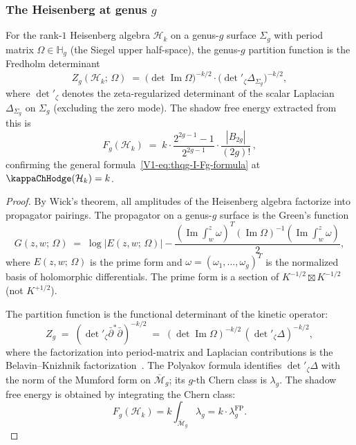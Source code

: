 \subsubsection{The Heisenberg at genus $g$}

\begin{theorem}
\label{thm:heisenberg-sewing}
For the rank-$1$ Heisenberg algebra $\mathcal{H}_k$ on a genus-$g$ surface $\Sigma_g$ with period matrix $\Omega \in \mathbb{H}_g$ \textup{(}the Siegel upper half-space\textup{)}, the genus-$g$ partition function is the Fredholm determinant
\begin{equation}%
\boxed{ Z_g(\mathcal{H}_k;\,\Omega) \;=\; \bigl(\det\operatorname{Im}\Omega\bigr)^{-k/2} \cdot \bigl(\det{}'_\zeta \Delta_{\Sigma_g}\bigr)^{-k/2}, }
\end{equation}
where $\det{}'_\zeta$ denotes the zeta-regularized determinant of the scalar Laplacian $\Delta_{\Sigma_g}$ on $\Sigma_g$ \textup{(}excluding the zero mode\textup{)}. The shadow free energy extracted from this is
\begin{equation}%
F_g(\mathcal{H}_k) \;=\; k \cdot \frac{2^{2g-1}-1}{2^{2g-1}} \cdot \frac{|B_{2g}|}{(2g)!}\,,
\end{equation}
confirming the general formula~\eqref{V1-eq:thqg-I-Fg-formula} at $\kappaChHodge(\mathcal{H}_k) = k$.
\end{theorem}

\begin{proof}
By Wick's theorem, all amplitudes of the Heisenberg algebra factorize into propagator pairings. The propagator on a genus-$g$ surface is the Green's function
\begin{equation}%
G(z,w;\,\Omega) \;=\; \log|E(z,w;\,\Omega)| - \frac{(\operatorname{Im}\int_w^z \omega)^T (\operatorname{Im}\Omega)^{-1} (\operatorname{Im}\int_w^z \omega)}{2},
\end{equation}
where $E(z,w;\,\Omega)$ is the prime form and $\omega = (\omega_1, \ldots, \omega_g)^T$ is the normalized basis of holomorphic differentials. The prime form is a section of $K^{-1/2} \boxtimes K^{-1/2}$ (not $K^{+1/2}$).

The partition function is the functional determinant of the kinetic operator:
\[
Z_g \;=\; (\det{}'_\zeta \bar{\partial}^*\bar{\partial})^{-k/2} \;=\; (\det\operatorname{Im}\Omega)^{-k/2}\, (\det{}'_\zeta \Delta)^{-k/2},
\]
where the factorization into period-matrix and Laplacian contributions is the Belavin--Knizhnik factorization~\cite{BK86}. The Polyakov formula identifies $\det{}'_\zeta \Delta$ with the norm of the Mumford form on $\overline{\mathcal{M}}_g$; its $g$-th Chern class is $\lambda_g$. The shadow free energy is obtained by integrating the Chern class:
\[
F_g(\mathcal{H}_k) = k \int_{\overline{\mathcal{M}}_g} \lambda_g = k \cdot \lambda_g^{\mathrm{FP}}.
\]
\end{proof}


